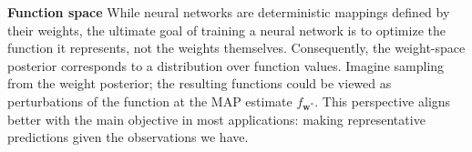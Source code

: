 \documentclass{article}
\newcommand{\mbf}[1]{\mathbf{#1}}
\newcommand{\vw}{\mbf{w}}
\begin{document}
\textbf{Function space} 
While neural networks are deterministic mappings defined by their weights, the ultimate goal of training a neural network is to optimize the function it represents, not the weights themselves. Consequently, the weight-space posterior corresponds to a distribution over function values. Imagine sampling from the weight posterior; the resulting functions could be viewed as perturbations of the function at the MAP estimate $f_{\vw^*}$. This perspective aligns better with the main objective in most applications: making representative predictions given the observations we have.
\end{document}
